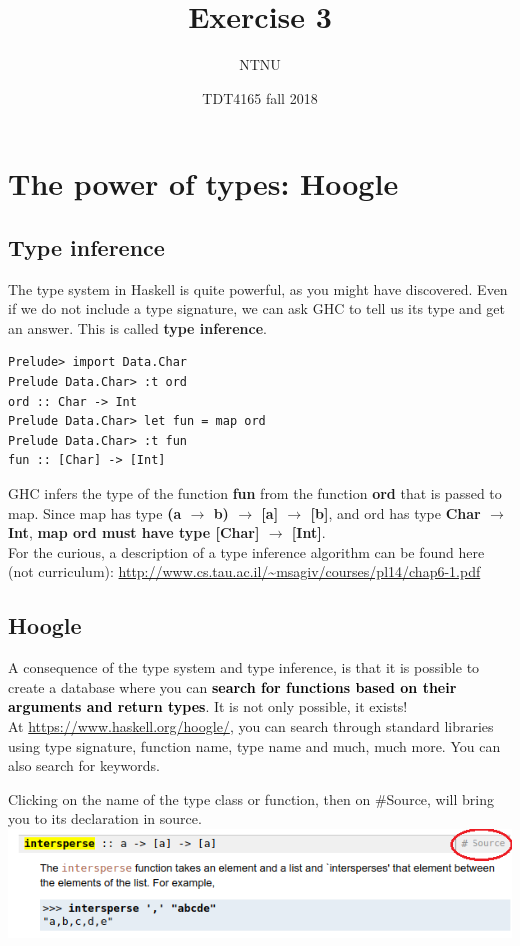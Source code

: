 \documentclass{article}
\title{Exercise 3}
\author{NTNU}
\date{TDT4165 fall 2018}
\begin{document}
\maketitle

\section{The power of types: Hoogle}
\subsection{Type inference}
The type system in Haskell is quite powerful, as you might have discovered. Even if we do not include a type signature, we can ask GHC to tell us its type and get an answer. This is called \textbf{type inference}.
\lstset{language=Haskell}
\begin{lstlisting}
Prelude> import Data.Char
Prelude Data.Char> :t ord
ord :: Char -> Int
Prelude Data.Char> let fun = map ord
Prelude Data.Char> :t fun 
fun :: [Char] -> [Int]
\end{lstlisting}
GHC infers the type of the function \textbf{fun} from the function \textbf{ord} that is passed to map. Since map has type \textbf{(a $\rightarrow$ b) $\rightarrow$ [a] $\rightarrow$ [b]}, and ord has type \textbf{Char $\rightarrow$ Int}, \textbf{map ord must have type [Char] $\rightarrow$ [Int]}.\\
For the curious, a description of a type inference algorithm can be found here (not curriculum): \url{http://www.cs.tau.ac.il/~msagiv/courses/pl14/chap6-1.pdf}

\textcolor{dkgreen}{\subsection{Hoogle}
A consequence of the type system and type inference, is that it is possible to create a database where you can \textcolor{black}{\textbf{search for functions based on their arguments and return types}}. It is not only possible, it exists!\\
At \textcolor{mauve}{\url{https://www.haskell.org/hoogle/}}, you can search through standard libraries using type signature, function name, type name and much, much more. You can also search for keywords.}
Clicking on the name of the type class or function, then on #Source, will bring you to its declaration in source.\\
\includegraphics[scale=0.5]{hoogle.png}
\end{document}
